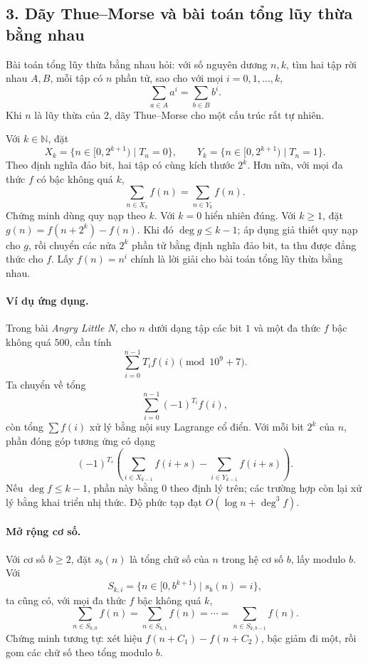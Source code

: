 \documentclass[11pt]{article}
\begin{document}
\subsection*{3. Dãy Thue--Morse và bài toán tổng lũy thừa bằng nhau}

Bài toán tổng lũy thừa bằng nhau hỏi: với số nguyên dương \(n,k\), tìm hai tập
rời nhau \(A,B\), mỗi tập có \(n\) phần tử, sao cho với mọi \(i=0,1,\ldots,k\),
\[
  \sum_{a\in A} a^i=\sum_{b\in B} b^i.
\]
Khi \(n\) là lũy thừa của \(2\), dãy Thue--Morse cho một cấu trúc rất tự nhiên.

Với \(k\in\mathbb N\), đặt
\[
  X_k=\{n\in[0,2^{k+1})\mid T_n=0\},\qquad
  Y_k=\{n\in[0,2^{k+1})\mid T_n=1\}.
\]
Theo định nghĩa đảo bit, hai tập có cùng kích thước \(2^k\). Hơn nữa, với mọi
đa thức \(f\) có bậc không quá \(k\),
\[
  \sum_{n\in X_k} f(n)=\sum_{n\in Y_k} f(n).
\]
Chứng minh dùng quy nạp theo \(k\). Với \(k=0\) hiển nhiên đúng. Với
\(k\ge1\), đặt \(g(n)=f(n+2^k)-f(n)\). Khi đó \(\deg g\le k-1\); áp dụng giả
thiết quy nạp cho \(g\), rồi chuyển các nửa \(2^k\) phần tử bằng định nghĩa đảo
bit, ta thu được đẳng thức cho \(f\). Lấy \(f(n)=n^i\) chính là lời giải cho
bài toán tổng lũy thừa bằng nhau.

\paragraph{Ví dụ ứng dụng.}
Trong bài \emph{Angry Little N}, cho \(n\) dưới dạng tập các bit \(1\) và một
đa thức \(f\) bậc không quá \(500\), cần tính
\[
  \sum_{i=0}^{n-1} T_i f(i)\pmod {10^9+7}.
\]
Ta chuyển về tổng
\[
  \sum_{i=0}^{n-1}(-1)^{T_i}f(i),
\]
còn tổng \(\sum f(i)\) xử lý bằng nội suy Lagrange cổ điển. Với mỗi bit
\(2^k\) của \(n\), phần đóng góp tương ứng có dạng
\[
  (-1)^{T_s}\left(\sum_{i\in X_{k-1}} f(i+s)
  -\sum_{i\in Y_{k-1}} f(i+s)\right).
\]
Nếu \(\deg f\le k-1\), phần này bằng \(0\) theo định lý trên; các trường hợp
còn lại xử lý bằng khai triển nhị thức. Độ phức tạp đạt
\(O(\log n+\deg^3 f)\).

\paragraph{Mở rộng cơ số.}
Với cơ số \(b\ge2\), đặt \(s_b(n)\) là tổng chữ số của \(n\) trong hệ cơ số
\(b\), lấy modulo \(b\). Với
\[
  S_{k,i}=\{n\in[0,b^{k+1})\mid s_b(n)=i\},
\]
ta cũng có, với mọi đa thức \(f\) bậc không quá \(k\),
\[
  \sum_{n\in S_{k,0}} f(n)=
  \sum_{n\in S_{k,1}} f(n)=\cdots=
  \sum_{n\in S_{k,b-1}} f(n).
\]
Chứng minh tương tự: xét hiệu \(f(n+C_1)-f(n+C_2)\), bậc giảm đi một, rồi gom
các chữ số theo tổng modulo \(b\).
\end{document}
